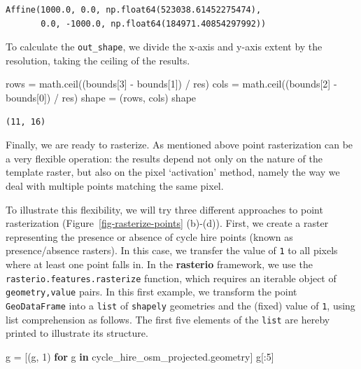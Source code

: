 \documentclass[
  letterpaper,
]{krantz}
\newenvironment{Shaded}{\begin{snugshade}}{\end{snugshade}}
\newcommand{\ControlFlowTok}[1]{\textcolor[rgb]{0.00,0.23,0.31}{\textbf{#1}}}
\newcommand{\DecValTok}[1]{\textcolor[rgb]{0.68,0.00,0.00}{#1}}
\newcommand{\KeywordTok}[1]{\textcolor[rgb]{0.00,0.23,0.31}{\textbf{#1}}}
\newcommand{\NormalTok}[1]{\textcolor[rgb]{0.00,0.23,0.31}{#1}}
\newcommand{\OperatorTok}[1]{\textcolor[rgb]{0.37,0.37,0.37}{#1}}
\begin{document}
\begin{verbatim}
Affine(1000.0, 0.0, np.float64(523038.61452275474),
       0.0, -1000.0, np.float64(184971.40854297992))
\end{verbatim}

To calculate the \texttt{out\_shape}, we divide the x-axis and y-axis
extent by the resolution, taking the ceiling of the results.

\begin{Shaded}
\begin{Highlighting}[]
\NormalTok{rows }\OperatorTok{=}\NormalTok{ math.ceil((bounds[}\DecValTok{3}\NormalTok{] }\OperatorTok{{-}}\NormalTok{ bounds[}\DecValTok{1}\NormalTok{]) }\OperatorTok{/}\NormalTok{ res)}
\NormalTok{cols }\OperatorTok{=}\NormalTok{ math.ceil((bounds[}\DecValTok{2}\NormalTok{] }\OperatorTok{{-}}\NormalTok{ bounds[}\DecValTok{0}\NormalTok{]) }\OperatorTok{/}\NormalTok{ res)}
\NormalTok{shape }\OperatorTok{=}\NormalTok{ (rows, cols)}
\NormalTok{shape}
\end{Highlighting}
\end{Shaded}

\begin{verbatim}
(11, 16)
\end{verbatim}

Finally, we are ready to rasterize. As mentioned above point
rasterization can be a very flexible operation: the results depend not
only on the nature of the template raster, but also on the pixel
`activation' method, namely the way we deal with multiple points
matching the same pixel.

To illustrate this flexibility, we will try three different approaches
to point rasterization (Figure~\ref{fig-rasterize-points} (b)-(d)).
First, we create a raster representing the presence or absence of cycle
hire points (known as presence/absence rasters). In this case, we
transfer the value of \texttt{1} to all pixels where at least one point
falls in. In the \textbf{rasterio} framework, we use the
\texttt{rasterio.features.rasterize} function, which requires an
iterable object of \texttt{geometry,value} pairs. In this first example,
we transform the point \texttt{GeoDataFrame} into a \texttt{list} of
\texttt{shapely} geometries and the (fixed) value of \texttt{1}, using
list comprehension as follows. The first five elements of the
\texttt{list} are hereby printed to illustrate its structure.

\begin{Shaded}
\begin{Highlighting}[]
\NormalTok{g }\OperatorTok{=}\NormalTok{ [(g, }\DecValTok{1}\NormalTok{) }\ControlFlowTok{for}\NormalTok{ g }\KeywordTok{in}\NormalTok{ cycle\_hire\_osm\_projected.geometry]}
\NormalTok{g[:}\DecValTok{5}\NormalTok{]}
\end{Highlighting}
\end{Shaded}
\end{document}
